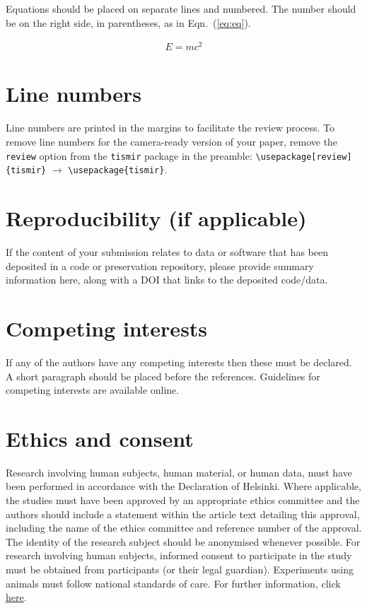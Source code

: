 \documentclass{article}
\begin{document}
Equations should be placed on separate lines and numbered.
The number should be on the right side, in parentheses,
as in Eqn.~(\ref{eq:eq}).

\begin{align}\label{eq:eq}
  E = mc^2
\end{align}

\section{Line numbers}
Line numbers are printed in the margins to facilitate the
review process. To remove line numbers for the camera-ready
version of your paper, remove the \verb=review= option from the
\verb=tismir= package in the preamble:
\verb=\usepackage[review]{tismir}= $\rightarrow$
\verb=\usepackage{tismir}=.

\section{Reproducibility (if applicable)}

If the content of your submission relates to data or software
that has been deposited in a code or preservation repository,
please provide summary information here, along with a DOI that
links to the deposited code/data.

\section{Competing interests}

If any of the authors have any competing interests then these
must be declared. A short paragraph should be placed before
the references.
Guidelines for competing interests are available online.%

\section{Ethics and consent}

Research involving human subjects, human material, or human data,
must have been performed in accordance with the Declaration of Helsinki.
Where applicable, the studies must have been approved by an appropriate
ethics committee and the authors should include a statement within
the article text detailing this approval, including the name of the ethics committee and reference number of the approval.
The identity of the research subject should be anonymised whenever possible.
For research involving human subjects, informed consent to participate
in the study must be obtained from participants (or their legal guardian).
%
Experiments using animals must follow national standards of care.
For further information, click \href{http://bit.ly/1rBoe0S}{here}.
\end{document}
